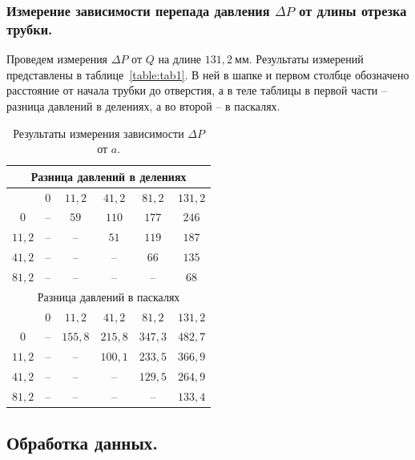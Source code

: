 \documentclass[a4paper,11pt]{article}
\begin{document}
\subsubsection{Измерение зависимости перепада давления $\Delta P$ от длины отрезка трубки.}
Проведем измерения $\Delta P$ от $Q$ на длине $131,2\ мм$. Результаты измерений представлены в таблице~\ref{table:tab1}. В ней в шапке и первом столбце обозначено расстояние от начала трубки до отверстия, а в теле таблицы в первой части -- разница давлений в делениях, а во второй -- в паскалях.
\begin{table}[h!]
\centering
\begin{tabular}{ ||c|c|c|c|c|c|| }
  \hline
  \multicolumn{6}{||c||}{Разница давлений в делениях} \\
  \hline
   & $0$ & $11,2$ & $41,2$ & $81,2$ & $131,2$ \\
  \hline
   $0$   & -- & $59$ & $110$ & $177$ & $246$ \\
  $11,2$ & -- &  --  & $51$  & $119$ & $187$ \\
  $41,2$ & -- &  --  &  --   & $66$  & $135$ \\
  $81,2$ & -- &  --  &  --   &  --   & $68$  \\
  \hline
  \hline
  \multicolumn{6}{||c||}{Разница давлений в паскалях} \\
  \hline
   & $0$ & $11,2$ & $41,2$ & $81,2$ & $131,2$ \\
  \hline
   $0$   & -- & $155,8$ & $215,8$ & $347,3$ & $482,7$ \\
  $11,2$ & -- &    --   & $100,1$ & $233,5$ & $366,9$ \\
  $41,2$ & -- &    --   &    --   & $129,5$ & $264,9$ \\
  $81,2$ & -- &    --   &    --   &    --   & $133,4$ \\
  \hline
\end{tabular}
\caption{Результаты измерения зависимости $\Delta P$ от $a$.}
\label{table:tab2}
\end{table}
\subsection{Обработка данных.} %
\end{document}
